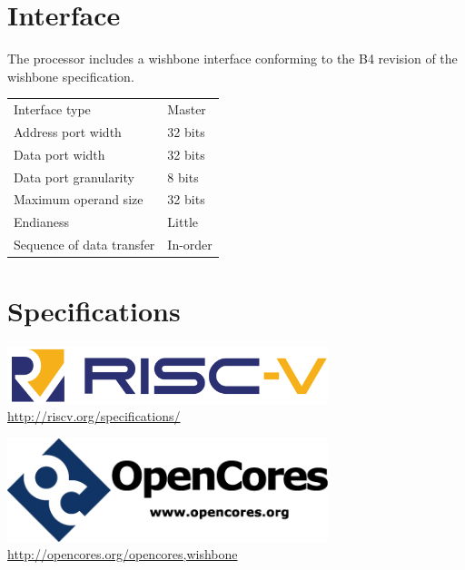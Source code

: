 \documentclass[10pt,a4paper]{article}
\begin{document}
\begin{minipage}[t]{0.48\textwidth}
\section{Interface}

The processor includes a wishbone interface conforming to the B4 revision of the
wishbone specification.\\

\begin{tabularx}{\textwidth}{|l|X|}
\hline
Interface type & Master \\
Address port width & 32 bits \\
Data port width & 32 bits \\
Data port granularity & 8 bits \\
Maximum operand size & 32 bits \\
Endianess & Little \\
Sequence of data transfer & In-order \\
\hline
\end{tabularx}

\section{Specifications}

\center\includegraphics[width=0.7\textwidth]{riscv.png}
\url{http://riscv.org/specifications/}

\center\includegraphics[width=0.7\textwidth]{opencores.png}
\url{http://opencores.org/opencores,wishbone}

\end{minipage}\hfill
\end{document}
